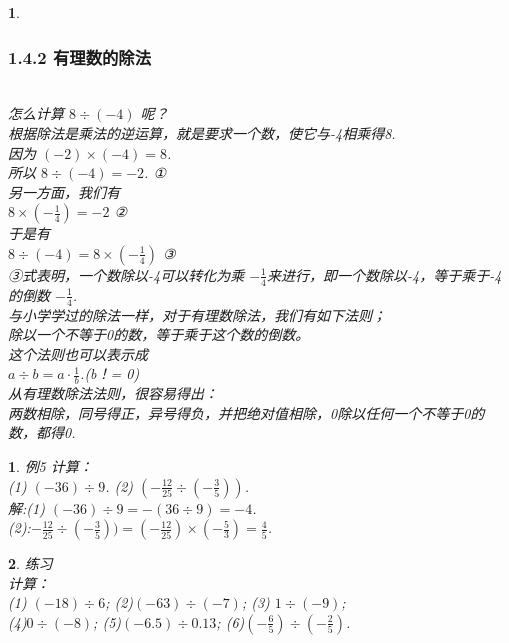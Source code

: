 \documentclass[11pt]{article}
\newtheorem{exercise}{ }
\newtheorem{article}{ }
\begin{document}
\begin{article}
\subsubsection*{1.4.2 有理数的除法} \\
怎么计算 $ 8\div(-4)$ 呢？\\
根据除法是乘法的逆运算，就是要求一个数，使它与-4相乘得8.\\
因为  $ (-2)\times(-4) = 8 $.\\
所以  $ 8\div(-4) = -2$.  ①\\
另一方面，我们有  \\
    $  8\times (-\frac{1}{4})=-2 $ ②\\
于是有 \\
    $ 8 \div (-4) = 8\times (-\frac{1}{4}) $ ③\\
③式表明，一个数除以-4可以转化为乘 $-\frac{1}{4}$来进行，即一个数除以-4，等于乘于-4的倒数 $ -\frac{1}{4}$.\\
    与小学学过的除法一样，对于有理数除法，我们有如下法则；\\
    除以一个不等于0的数，等于乘于这个数的倒数。\\
    这个法则也可以表示成\\
        $ a\div b=a \cdot \frac{1}{b}$.(b！= 0) \\
        从有理数除法法则，很容易得出：\\
        两数相除，同号得正，异号得负，并把绝对值相除，0除以任何一个不等于0的数，都得0.\\
\end{article}


\begin{exercise}
例5 计算：\\
(1) $ (-36)\div 9 $. (2) $ (- \frac{12}{25} \div (- \frac{3}{5})) $.\\
解:(1) $ (-36)\div 9 = -(36 \div 9) = -4 $.\\

(2):$ - \frac{12}{25} \div (- \frac{3}{5})) = (- \frac{12}{25}) \times (- \frac{5}{3}) = \frac{4}{5} $.\\
\end{exercise}

\begin{exercise}
练习\\

计算：\\
(1) $(-18) \div 6 $;
(2)$(-63) \div (-7)$;
(3) $ 1 \div (-9) $; \\
(4)$ 0 \div (-8) $;
(5)$(-6.5) \div 0.13$;
(6)$(-\frac{6}{5}) \div (-\frac{2}{5})$.
\end{exercise}
\end{document}
